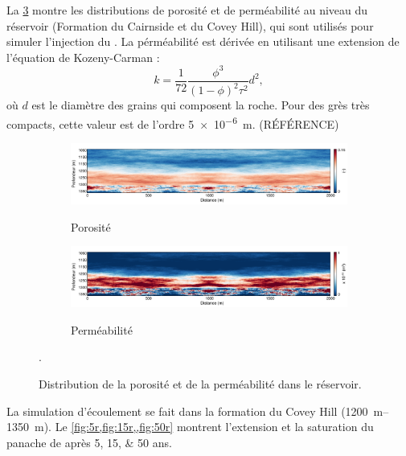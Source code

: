 La \cref{fig:res} montre les distributions de porosité et de perméabilité au niveau du réservoir (Formation du Cairnside et du Covey Hill), qui sont utilisés pour simuler l'injection du . La pérméabilité est dérivée en utilisant une extension de l'équation de Kozeny-Carman \citep{Kozeny1927,Carman1938}:
\begin{equation}
k = \dfrac{1}{72}\dfrac{\phi^3}{(1-\phi)^2\tau^2}d^2,
\end{equation}
où $d$ est le diamètre des grains qui composent la roche. Pour des grès très compacts, cette valeur est de l'ordre \SI{5e-6}{\metre}. (RÉFÉRENCE) 
\begin{figure}[!ht]
        \centering
        \begin{subfigure}[b]{1\textwidth}
                \caption{Porosité}
                \includegraphics[width=\textwidth]{fig/phi_res.pdf}
                \label{fig:phi_res}
        \end{subfigure}%

        \begin{subfigure}[b]{1\textwidth}
                \caption{Perméabilité}
                \includegraphics[width=\textwidth]{fig/K_res.pdf}
                \label{fig:K_res}
        \end{subfigure}

        \caption{Distribution de la porosité et de la perméabilité dans le réservoir.}
        \label{fig:res}.
\end{figure}
La simulation d'écoulement se fait dans la formation du Covey Hill (\SIrange{1200}{1350}{\metre}). Le \cref{fig:5r,fig:15r,,fig:50r} montrent l'extension et la saturation du panache de  après \numlist{5;15;50} ans.\\

